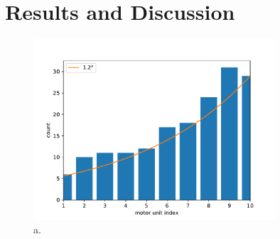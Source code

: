 \section{Results and Discussion}


\begin{figure}%
  \centering%
  \includegraphics[width=0.8\textwidth]{images/motor_unit_assignment/MU_fibre_distribution_13x13_10_fiber_distribution.pdf}%
  \caption{a.}%
  \label{fig:MU_fibre_distribution_13x13_10_fiber_distribution}%
\end{figure}

